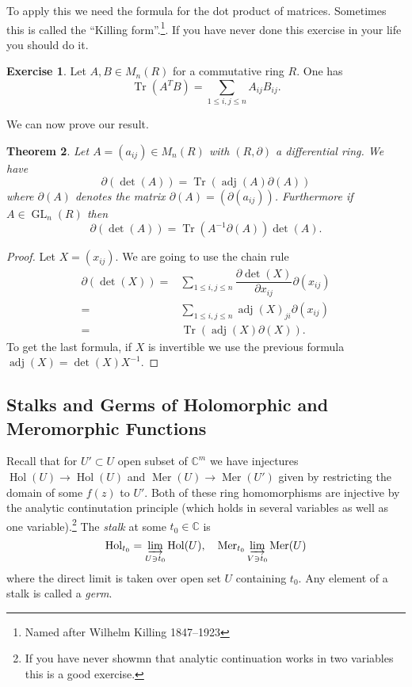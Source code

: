 \documentclass[]{book}
\numberwithin{equation}{section}
\newtheorem{theorem}{Theorem}[subsection]
\theoremstyle{definition}
\newtheorem{exercise}[theorem]{Exercise}
\theoremstyle{remark}
\newcommand{\CC}{\mathbb{C}}
\newcommand{\hol}{\operatorname{Hol}}
\newcommand{\Mer}{\operatorname{Mer}}
\newcommand{\adj}{\operatorname{adj}}
\newcommand{\GL}{\operatorname{GL}}
\newcommand{\Tr}{\operatorname{Tr}}
\begin{document}
To apply this we need the formula for the dot product of matrices. 
Sometimes this is called the ``Killing form''.\footnote{Named after Wilhelm Killing 1847--1923}.
If you have never done this exercise in your life you should do it.
\begin{exercise}
	Let $A,B \in M_n(R)$ for a commutative ring $R$. 
	One has 
	$$\Tr(A^TB) = \sum_{1\leq i,j \leq n}A_{ij}B_{ij}.$$ 
\end{exercise}
We can now prove our result.
\begin{theorem}
	Let $A = (a_{ij}) \in M_n(R)$ with $(R,\partial)$ a differential ring. 
	We have 
	 $$ \partial(\det(A)) = \Tr(\adj(A) \partial(A))$$
	where $\partial(A)$ denotes the matrix $\partial(A)= ( \partial(a_{ij}))$.
	Furthermore if $A \in \GL_n(R)$ then 
	 $$\partial(\det(A)) = \Tr( A^{-1} \partial(A)) \det(A).$$
\end{theorem}
\begin{proof}
	Let $X = (x_{ij})$.
	We are going to use the chain rule
	\begin{align*}
		\partial(\det(X)) =& \sum_{1\leq i,j \leq n} \dfrac{\partial \det(X)}{\partial x_{ij}}\partial(x_{ij}) \\
		=& \sum_{1\leq i,j \leq n} \adj(X)_{ji} \partial(x_{ij}) \\
		=& \Tr( \adj(X)\partial(X)).
	\end{align*}
    To get the last formula, if $X$ is invertible we use the previous formula $\adj(X) = \det(X) X^{-1}$.
\end{proof}


\subsection{Stalks and Germs of Holomorphic and Meromorphic Functions}

Recall that for $U' \subset U$ open subset of $\CC^m$ we have injectures $\hol(U) \to \hol(U)$ and $\Mer(U) \to \Mer(U')$ given by restricting the domain of some $f(z)$ to $U'$.
Both of these ring homomorphisms are injective by the analytic continutation principle (which holds in several variables as well as one variable).\footnote{If you have never showmn that analytic continuation works in two variables this is a good exercise.}
The \emph{stalk} at some $t_0 \in \CC$ is 
 $$ \hol_{t_0} = \varinjlim_{U \owns t_0} \hol(U), \quad \Mer_{t_0} \varinjlim_{V \owns t_0} \Mer(U) $$
where the direct limit is taken over open set $U$ containing $t_0$.
Any element of a stalk is called a \emph{germ}. 
\end{document}

